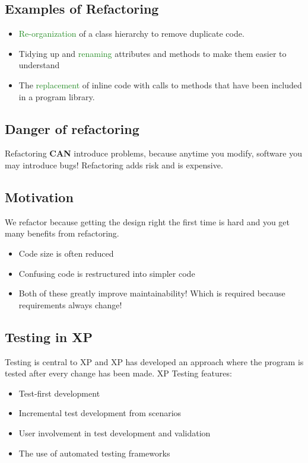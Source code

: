 \documentclass{report}
\newcommand{\textg}[1]{\textcolor{ForestGreen}{#1}}
\begin{document}
\newpage
\subsection{Examples of Refactoring}
\noindent
\begin{itemize}
  \item \textg{Re-organization} of a class hierarchy to remove duplicate code.
  \item Tidying up and \textg{renaming} attributes and methods to make them easier to understand
  \item The \textg{replacement} of inline code with calls to methods that have been included in a program library.
\end{itemize}

\subsection{Danger of refactoring}
\noindent Refactoring \textbf{CAN} introduce problems, because anytime you modify, software you may introduce bugs! Refactoring adds risk and is expensive.

\subsection{Motivation}
\noindent We refactor because getting the design right the first time is hard and you get many benefits from refactoring.
\begin{itemize}
  \item Code size is often reduced
  \item Confusing code is restructured into simpler code
  \item Both of these greatly improve maintainability! Which is required because requirements always change!
\end{itemize}

\subsection{Testing in XP}
\noindent Testing is central to XP and XP has developed an approach where the program is tested after every change has been made. XP Testing features:
\begin{itemize}
  \item Test-first development
  \item Incremental test development from scenarios
  \item User involvement in test development and validation
  \item The use of automated testing frameworks
\end{itemize}
\end{document}
